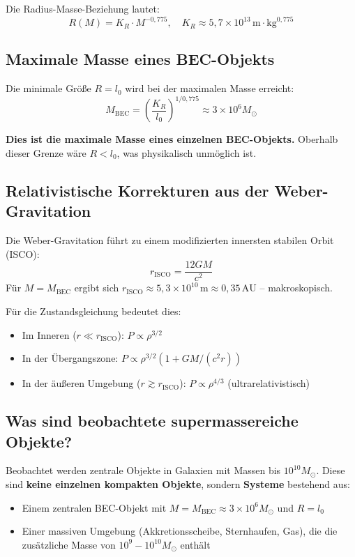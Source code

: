 \documentclass[12pt,a4paper]{article}
\begin{document}
Die Radius-Masse-Beziehung lautet:
\[
R(M) = K_R \cdot M^{-0{,}775}, \quad K_R \approx 5{,}7 \times 10^{13} \, \text{m} \cdot \text{kg}^{0,775}
\]

\subsection{Maximale Masse eines BEC-Objekts}

Die minimale Größe $R = l_0$ wird bei der maximalen Masse erreicht:
\[
M_{\text{BEC}} = \left( \frac{K_R}{l_0} \right)^{1/0,775} \approx 3 \times 10^6 M_\odot
\]

\textbf{Dies ist die maximale Masse eines einzelnen BEC-Objekts.} Oberhalb dieser Grenze wäre $R < l_0$, was physikalisch unmöglich ist.

\subsection{Relativistische Korrekturen aus der Weber-Gravitation}

Die Weber-Gravitation führt zu einem modifizierten innersten stabilen Orbit (ISCO):
\[
r_{\text{ISCO}} = \frac{12GM}{c^2}
\]
Für $M = M_{\text{BEC}}$ ergibt sich $r_{\text{ISCO}} \approx 5{,}3 \times 10^{10}\,\text{m} \approx 0{,}35\,\text{AU}$ – makroskopisch.

Für die Zustandsgleichung bedeutet dies:
\begin{itemize}
\item Im Inneren ($r \ll r_{\text{ISCO}}$): $P \propto \rho^{3/2}$
\item In der Übergangszone: $P \propto \rho^{3/2} (1 + GM/(c^2 r))$
\item In der äußeren Umgebung ($r \gtrsim r_{\text{ISCO}}$): $P \propto \rho^{4/3}$ (ultrarelativistisch)
\end{itemize}

\subsection{Was sind beobachtete supermassereiche Objekte?}

Beobachtet werden zentrale Objekte in Galaxien mit Massen bis $10^{10} M_\odot$. Diese sind \textbf{keine einzelnen kompakten Objekte}, sondern \textbf{Systeme} bestehend aus:
\begin{itemize}
\item Einem zentralen BEC-Objekt mit $M = M_{\text{BEC}} \approx 3 \times 10^6 M_\odot$ und $R = l_0$
\item Einer massiven Umgebung (Akkretionsscheibe, Sternhaufen, Gas), die die zusätzliche Masse von $10^9 - 10^{10} M_\odot$ enthält
\end{itemize}
\end{document}
